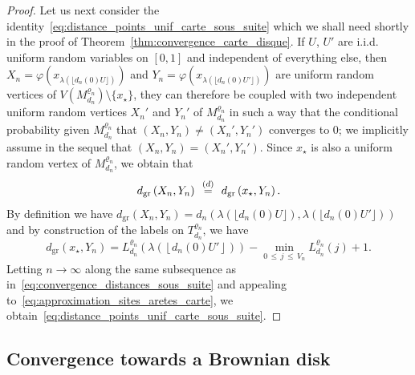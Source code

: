 \documentclass[AHL,Unicode,longabstracts,published]{cedram}
\newcommand{\1}{\ensembles{1}}
\renewcommand{\le}{\leqslant}
\newcommand{\mn}{M_{d_n}^{\varrho_n}}
\newcommand{\dgr}{d_{\mathrm{gr}}}
\newcommand{\fn}{T_{d_n}^{\varrho_n}}
\newcommand{\Lfn}{L_{d_n}^{\varrho_n}}
\newcommand{\vertices}{V}
\newcommand{\eqloi}{\enskip\mathop{=}^{(d)}\enskip}
\begin{document}
\begin{proof}
Let us next consider the identity~\eqref{eq:distance_points_unif_carte_sous_suite} which we shall need shortly in the proof of Theorem~\ref{thm:convergence_carte_disque}. If $U$, $U'$ are i.i.d. uniform random variables on $[0,1]$ and independent of everything else, then $X_n = \varphi(x_{\lambda(\lfloor d_n(0) U\rfloor)})$ and $Y_n = \varphi(x_{\lambda(\lfloor d_n(0) U'\rfloor)})$ are uniform random vertices of $V(\mn) \setminus \{x_\star\}$, they can therefore be coupled with two independent uniform random vertices $X_n'$ and $Y_n'$ of $\mn$ in such a way that the conditional probability given $\mn$ that $(X_n,Y_n) \ne (X_n', Y_n')$ converges to $0$; we implicitly assume in the sequel that $(X_n,Y_n) = (X_n', Y_n')$. Since $x_\star$ is also a uniform random vertex of $\mn$, we obtain that
\[
\dgr\left(X_n,Y_n\right) \eqloi \dgr\left(x_\star, Y_n\right).
\]
By definition we have $\dgr(X_n,Y_n) = d_n(\lambda(\lfloor d_n(0) U\rfloor), \lambda(\lfloor d_n(0) U'\rfloor))$ and by construction of the labels on $\fn$, we have
\[
\dgr\left(x_\star, Y_n\right) = \Lfn\left(\lambda\left(\left\lfloor d_n(0) U'\right\rfloor\right)\right) - \min_{0\,\le\,j\,\le\,\vertices_n} \Lfn(j) + 1.
\]
Letting $n \to \infty$ along the same subsequence as in~\eqref{eq:convergence_distances_sous_suite} and appealing to~\eqref{eq:approximation_sites_aretes_carte}, we obtain~\eqref{eq:distance_points_unif_carte_sous_suite}.
\end{proof}



\subsection{Convergence towards a Brownian disk}\label{sec:carte_brownienne}
\end{document}
